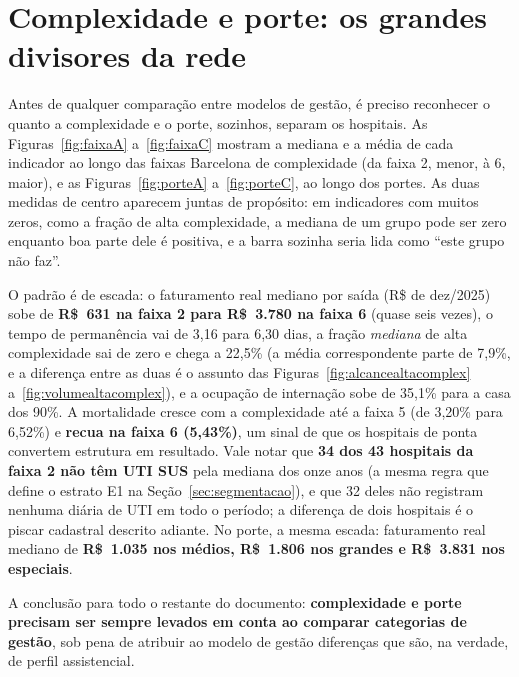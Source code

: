 \section{Complexidade e porte: os grandes divisores da rede}
\label{sec:complexidadeporte}

Antes de qualquer comparação entre modelos de gestão, é preciso
reconhecer o quanto a complexidade e o porte, sozinhos, separam os
hospitais. As Figuras~\ref{fig:faixaA} a~\ref{fig:faixaC} mostram a
mediana e a média de cada indicador ao longo das faixas Barcelona de
complexidade (da faixa 2, menor, à 6, maior), e as
Figuras~\ref{fig:porteA} a~\ref{fig:porteC}, ao longo dos portes. As duas
medidas de centro aparecem juntas de propósito: em indicadores com muitos
zeros, como a fração de alta complexidade, a mediana de um grupo pode ser
zero enquanto boa parte dele é positiva, e a barra sozinha seria lida
como ``este grupo não faz''.

O padrão é de escada: o faturamento real mediano por saída (R\$ de
dez/2025) sobe de \textbf{R\$~631
na faixa 2 para R\$~3.780 na faixa 6} (quase seis vezes), o tempo de
permanência vai de 3,16 para 6,30 dias, a fração \emph{mediana} de alta
complexidade sai de zero e chega a 22,5\% (a média correspondente parte
de 7,9\%, e a diferença entre as duas é o assunto das
Figuras~\ref{fig:alcancealtacomplex} a~\ref{fig:volumealtacomplex}), e a
ocupação de internação sobe de 35,1\%
para a casa dos 90\%. A mortalidade cresce com a complexidade até a
faixa 5 (de 3,20\% para 6,52\%) e \textbf{recua na faixa 6 (5,43\%)},
um sinal de que os hospitais de ponta convertem estrutura em resultado.
Vale notar que \textbf{34 dos 43 hospitais da faixa 2 não têm UTI SUS}
pela mediana dos onze anos (a mesma regra que define o estrato E1 na
Seção~\ref{sec:segmentacao}), e que 32 deles não registram nenhuma
diária de UTI em todo o período; a diferença de dois hospitais é o
piscar cadastral descrito adiante. No
porte, a mesma escada: faturamento real mediano de \textbf{R\$~1.035 nos
médios, R\$~1.806 nos grandes e R\$~3.831 nos especiais}.

A conclusão para todo o restante do documento: \textbf{complexidade e
porte precisam ser sempre levados em conta ao comparar categorias de
gestão}, sob pena de atribuir ao modelo de gestão diferenças que são,
na verdade, de perfil assistencial.
\newpage
{}

